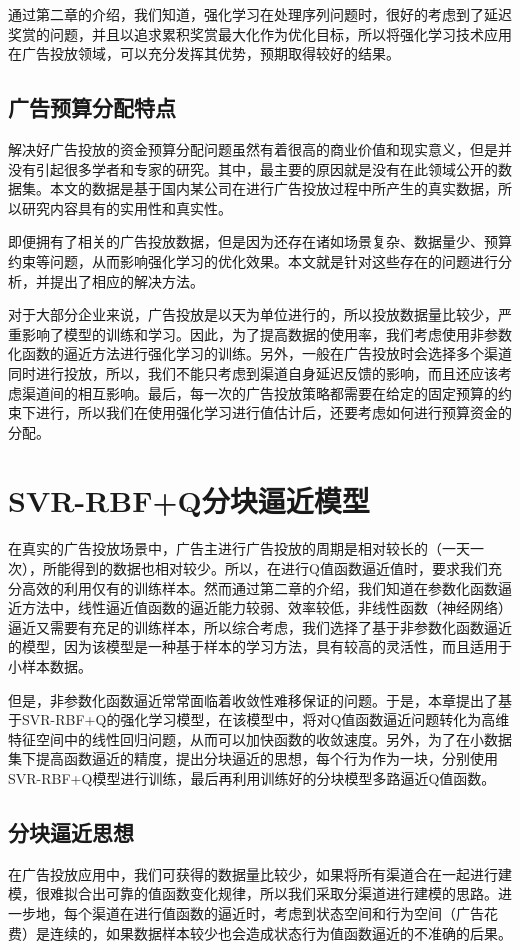 通过第二章的介绍，我们知道，强化学习在处理序列问题时，很好的考虑到了延迟奖赏的问题，并且以追求累积奖赏最大化作为优化目标，所以将强化学习技术应用在广告投放领域，可以充分发挥其优势，预期取得较好的结果。

\subsection{广告预算分配特点}
解决好广告投放的资金预算分配问题虽然有着很高的商业价值和现实意义，但是并没有引起很多学者和专家的研究。其中，最主要的原因就是没有在此领域公开的数据集。本文的数据是基于国内某公司在进行广告投放过程中所产生的真实数据，所以研究内容具有的实用性和真实性。

即便拥有了相关的广告投放数据，但是因为还存在诸如场景复杂、数据量少、预算约束等问题，从而影响强化学习的优化效果。本文就是针对这些存在的问题进行分析，并提出了相应的解决方法。

对于大部分企业来说，广告投放是以天为单位进行的，所以投放数据量比较少，严重影响了模型的训练和学习。因此，为了提高数据的使用率，我们考虑使用非参数化函数的逼近方法进行强化学习的训练。另外，一般在广告投放时会选择多个渠道同时进行投放，所以，我们不能只考虑到渠道自身延迟反馈的影响，而且还应该考虑渠道间的相互影响。最后，每一次的广告投放策略都需要在给定的固定预算的约束下进行，所以我们在使用强化学习进行值估计后，还要考虑如何进行预算资金的分配。

\section{SVR-RBF+Q分块逼近模型}
在真实的广告投放场景中，广告主进行广告投放的周期是相对较长的（一天一次），所能得到的数据也相对较少。所以，在进行Q值函数逼近值时，要求我们充分高效的利用仅有的训练样本。然而通过第二章的介绍，我们知道在参数化函数逼近方法中，线性逼近值函数的逼近能力较弱、效率较低，非线性函数（神经网络）逼近又需要有充足的训练样本，所以综合考虑，我们选择了基于非参数化函数逼近的模型，因为该模型是一种基于样本的学习方法，具有较高的灵活性，而且适用于小样本数据。

但是，非参数化函数逼近常常面临着收敛性难移保证的问题。于是，本章提出了基于SVR-RBF+Q的强化学习模型，在该模型中，将对Q值函数逼近问题转化为高维特征空间中的线性回归问题，从而可以加快函数的收敛速度。另外，为了在小数据集下提高函数逼近的精度，提出分块逼近的思想，每个行为作为一块，分别使用SVR-RBF+Q模型进行训练，最后再利用训练好的分块模型多路逼近Q值函数。

\subsection{分块逼近思想}
在广告投放应用中，我们可获得的数据量比较少，如果将所有渠道合在一起进行建模，很难拟合出可靠的值函数变化规律，所以我们采取分渠道进行建模的思路。进一步地，每个渠道在进行值函数的逼近时，考虑到状态空间和行为空间（广告花费）是连续的，如果数据样本较少也会造成状态行为值函数逼近的不准确的后果。

